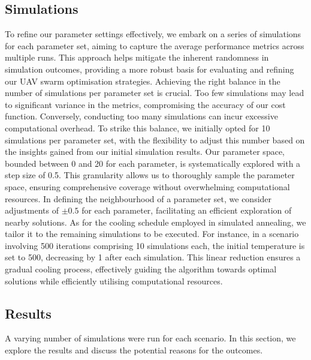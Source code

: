 \documentclass[12pt]{article}
\begin{document}
\subsection{Simulations}
To refine our parameter settings effectively, we embark on a series of simulations for each parameter set, aiming to capture the average performance metrics across multiple runs. This approach helps mitigate the inherent randomness in simulation outcomes, providing a more robust basis for evaluating and refining our UAV swarm optimisation strategies. Achieving the right balance in the number of simulations per parameter set is crucial. Too few simulations may lead to significant variance in the metrics, compromising the accuracy of our cost function. Conversely, conducting too many simulations can incur excessive computational overhead. To strike this balance, we initially opted for 10 simulations per parameter set, with the flexibility to adjust this number based on the insights gained from our initial simulation results. Our parameter space, bounded between 0 and 20 for each parameter, is systematically explored with a step size of 0.5. This granularity allows us to thoroughly sample the parameter space, ensuring comprehensive coverage without overwhelming computational resources. In defining the neighbourhood of a parameter set, we consider adjustments of $\pm 0.5$ for each parameter, facilitating an efficient exploration of nearby solutions. As for the cooling schedule employed in simulated annealing, we tailor it to the remaining simulations to be executed. For instance, in a scenario involving 500 iterations comprising 10 simulations each, the initial temperature is set to 500, decreasing by 1 after each simulation. This linear reduction ensures a gradual cooling process, effectively guiding the algorithm towards optimal solutions while efficiently utilising computational resources.

\subsection{Results}
A varying number of simulations were run for each scenario. In this section, we explore the results and discuss the potential reasons for the outcomes.
\end{document}
